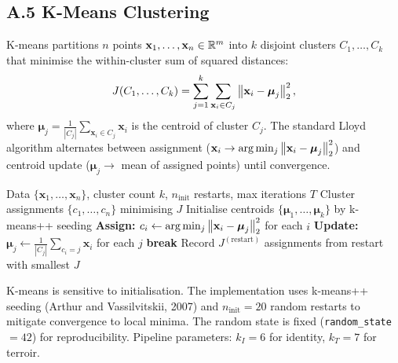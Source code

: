 \documentclass[11pt]{article}
\begin{document}
\subsection*{A.5 K-Means Clustering}
K-means partitions $n$ points $\mathbf{x}_1, \ldots, \mathbf{x}_n \in \mathbb{R}^m$ into $k$ disjoint clusters $C_1, \ldots, C_k$ that minimise the within-cluster sum of squared distances:
\[
J(C_1, \ldots, C_k) = \sum_{j=1}^{k} \sum_{\mathbf{x}_i \in C_j} \left\lVert \mathbf{x}_i - \boldsymbol\mu_j \right\rVert_2^2,
\]
where $\boldsymbol\mu_j = \frac{1}{|C_j|} \sum_{\mathbf{x}_i \in C_j} \mathbf{x}_i$ is the centroid of cluster $C_j$. The standard Lloyd algorithm alternates between assignment ($\mathbf{x}_i \to \arg\min_j \left\lVert \mathbf{x}_i - \boldsymbol\mu_j \right\rVert_2^2$) and centroid update ($\boldsymbol\mu_j \to$ mean of assigned points) until convergence.

\begin{algorithm}[H]
\caption{Lloyd's K-means algorithm}
\begin{algorithmic}[1]
\Require Data $\{\mathbf{x}_1, \ldots, \mathbf{x}_n\}$, cluster count $k$, $n_\text{init}$ restarts, max iterations $T$
\Ensure Cluster assignments $\{c_1, \ldots, c_n\}$ minimising $J$
  \State Initialise centroids $\{\boldsymbol\mu_1, \ldots, \boldsymbol\mu_k\}$ by k-means++ seeding
    \State \textbf{Assign:} $c_i \gets \arg\min_j \left\lVert \mathbf{x}_i - \boldsymbol\mu_j \right\rVert_2^2$ for each $i$
    \State \textbf{Update:} $\boldsymbol\mu_j \gets \frac{1}{|C_j|} \sum_{c_i = j} \mathbf{x}_i$ for each $j$
     \textbf{break} \EndIf
  \EndFor
  \State Record $J^{(\text{restart})}$
\EndFor
\State \Return assignments from restart with smallest $J$
\end{algorithmic}
\end{algorithm}

K-means is sensitive to initialisation. The implementation uses k-means++ seeding (Arthur and Vassilvitskii, 2007) and $n_\text{init} = 20$ random restarts to mitigate convergence to local minima. The random state is fixed (\texttt{random\_state} $= 42$) for reproducibility. Pipeline parameters: $k_I = 6$ for identity, $k_T = 7$ for terroir.
\end{document}
